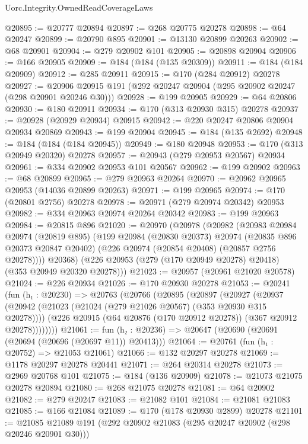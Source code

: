 \begin{lexlean}{Uorc.Integrity.OwnedReadCoverageLaws}
\begin{coremodule}
@20895 := @20777 @20894
@20897 := @268 @20775 @20278
@20898 := @64 @20247
@20899 := @20790 @895
@20901 := @13130 @20899 @20263
@20902 := @68 @20901
@20904 := @279 @20902 @101
@20905 := @20898 @20904
@20906 := @166 @20905
@20909 := @184 (@184 (@135 @20309))
@20911 := @184 (@184 @20909)
@20912 := @285 @20911
@20915 := @170 (@284 @20912) @20278
@20927 := @20906 @20915 @191 (@292 @20247 @20904 (@295 @20902 @20247 (@298 @20901 @20246 @30)))
@20928 := @199 @20905
@20929 := @64 @20806
@20930 := @180 @20911
@20934 := @170 (@313 @20930 @315) @20278
@20937 := @20928 (@20929 @20934) @20915
@20942 := @220 @20247 @20806 @20904 @20934 @20869
@20943 := @199 @20904
@20945 := @184 (@135 @2692)
@20948 := @184 (@184 (@184 @20945))
@20949 := @180 @20948
@20953 := @170 (@313 @20949 @20320) @20278
@20957 := @20943 (@279 @20953 @20567) @20934
@20961 := @334 @20902 @20953 @101 @20567
@20962 := @199 @20902
@20963 := @68 @20899
@20965 := @279 @20963 @20264
@20970 := @20962 @20965 @20953 (@14036 @20899 @20263)
@20971 := @199 @20965
@20974 := @170 (@20801 @2756) @20278
@20978 := @20971 (@279 @20974 @20342) @20953
@20982 := @334 @20963 @20974 @20264 @20342
@20983 := @199 @20963
@20984 := @20815 @896
@21020 := @20970
    (@20978
      (@20982
        (@20983
          @20984
          @20974
          (@20819 @895)
          (@199
            @20984
            (@20830 @20373)
            @20974
            (@20835 @896 @20373 @20847 @20402)
            (@226 @20974 (@20854 @20408) (@20857 @2756 @20278))))
        @20368)
      (@226 @20953 (@279 (@170 @20949 @20278) @20418) (@353 @20949 @20320 @20278)))
@21023 := @20957 (@20961 @21020 @20578)
@21024 := @226 @20934
@21026 := @170 @20930 @20278
@21053 := @20241
    (fun (h₁ : @20230) =>
    @20763
      (@20766
        (@20895
          (@20897
            (@20927
              (@20937
                (@20942 (@21023 (@21024 (@279 @21026 @20567) (@353 @20930 @315 @20278))))
                (@226 @20915 (@64 @20876 (@170 @20912 @20278)) (@367 @20912 @20278))))))))
@21061 := fun (h₂ : @20236) => @20647 (@20690 (@20691 (@20694 (@20696 (@20697 @11)) @20413)))
@21064 := @20761 (fun (h₁ : @20752) => @21053 @21061)
@21066 := @132 @20297 @20278
@21069 := @1178 @20297 @20278 @20441
@21071 := @264 @20314 @20278
@21073 := @2969 @20768 @101
@21075 := @184 (@136 @20909)
@21078 := @21073 @21075 @20278 @20894
@21080 := @268 @21075 @20278
@21081 := @64 @20902
@21082 := @279 @20247
@21083 := @21082 @101
@21084 := @21081 @21083
@21085 := @166 @21084
@21089 := @170 (@178 @20930 @2899) @20278
@21101 := @21085 @21089 @191 (@292 @20902 @21083 (@295 @20247 @20902 (@298 @20246 @20901 @30)))

\end{coremodule}
\end{lexlean}

